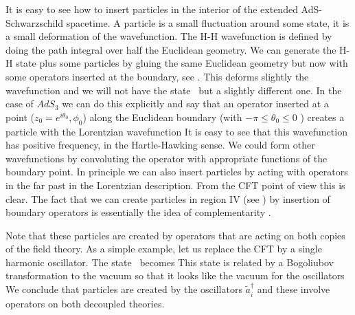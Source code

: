 \ifig{}
{}


It is easy to see how to insert particles in the interior of the 
extended AdS-Schwarzschild spacetime. 
A particle is a small fluctuation around some state, it is a small
deformation of the wavefunction. The H-H wavefunction is defined
by doing the path integral over half the Euclidean geometry. 
We can generate the H-H state plus
some particles  by gluing the same Euclidean geometry but
now with some operators inserted at the boundary, see  \particles . 
This deforms slightly 
the wavefunction and we will not have the state \wavefunction\ but
a slightly different one. 
In the case of $AdS_3$ we can do this  explicitly and say  that an 
operator inserted at a  point ($z_0= e^{i\theta_0},\phi_0$)  along 
the Euclidean boundary (with $- \pi \leq \theta_0 \leq 0$ )
  creates a particle with the Lorentzian 
 wavefunction 
\eqn{}
 It is easy to see that this wavefunction
has positive frequency, in the Hartle-Hawking sense.
 We could form other
wavefunctions by convoluting the operator with appropriate functions 
of the boundary point. 
In  principle we can also insert particles by acting with 
operators in the far past in the Lorentzian description. From the 
CFT point of view this is clear. The fact that we can create particles
in region IV (see  \penrose ) by insertion of boundary operators
is essentially   the idea of complementarity 
\complementarity .


Note that these particles are created by operators that are acting
on both copies of the field theory. As a simple example, let us 
replace the CFT by a single harmonic oscillator. The state 
\wavefunction\ becomes 
\eqn{} 
 This state is related by 
a Bogoliubov transformation to the vacuum so that it looks like
the vacuum for the oscillators 
\eqn{}
We conclude that particles are created by the 
oscillators $\tilde a_i^\dagger$ and these involve operators on both 
decoupled theories.  



